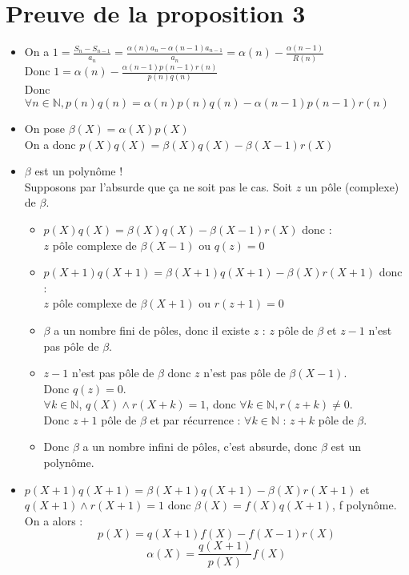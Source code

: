 \documentclass[17 pt,french]{scrartcl}
\begin{document}
	\section*{Preuve de la proposition 3}
	\begin{itemize}
	\item On a $1 = \frac{S_n-S_{n-1}}{a_n} = \frac{\alpha(n)a_n-\alpha(n-1)a_{n-1}}{a_n} = \alpha(n) - \frac{\alpha(n-1)}{R(n)}$\\
	Donc $1 = \alpha(n)-\frac{\alpha(n-1)p(n-1)r(n)}{p(n)q(n)}$\\
	Donc $\forall n \in \mathbb{N}, p(n)q(n) = \alpha(n)p(n)q(n) - \alpha(n-1)p(n-1)r(n)$
	\item On pose $\beta(X) = \alpha(X)p(X)$\\
	On a donc $p(X)q(X) = \beta(X)q(X)-\beta(X-1)r(X)$
	\item $\beta$ est un polynôme !\\
	Supposons par l'absurde que ça ne soit pas le cas. Soit $z$ un pôle (complexe) de $\beta$.
		\begin{itemize}
		\item $p(X)q(X) = \beta(X)q(X)-\beta(X-1)r(X)$ donc : \\
		$z$ pôle complexe de $\beta(X-1)$ ou $q(z) = 0$
		\item $p(X+1)q(X+1) = \beta(X+1)q(X+1)-\beta(X)r(X+1)$ donc : \\
		$z$ pôle complexe de $\beta(X+1)$ ou $r(z+1) = 0$
		\item $\beta$ a un nombre fini de pôles, donc il existe $z$ : $z$ pôle de $\beta$ et $z-1$ n'est pas pôle de $\beta$.
		\item $z-1$ n'est pas pôle de $\beta$ donc $z$ n'est pas pôle de $\beta(X-1)$. \\
		Donc $q(z) = 0$.\\
		$\forall k \in \mathbb{N}$, $q(X) \wedge r(X+k) = 1 $, donc $\forall k \in \mathbb{N}, r(z+k) \neq 0$.\\
		Donc $z+1$ pôle de $\beta$ et par récurrence : $\forall k \in \mathbb{N}$ : $z+k$ pôle de $\beta$.
		\item Donc $\beta$ a un nombre infini de pôles, c'est absurde, donc $\beta$ est un polynôme.
		\end{itemize}
	\item $p(X+1)q(X+1) = \beta(X+1)q(X+1)-\beta(X)r(X+1)$ et \\$q(X+1)\wedge r(X+1) = 1$ donc $\beta(X) = f(X)q(X+1)$, f polynôme.
	On a alors :  $$p(X) = q(X+1)f(X)-f(X-1)r(X)$$ $$\alpha(X) = \frac{q(X+1)}{p(X)}f(X)$$
	\end{itemize}
\end{document}
